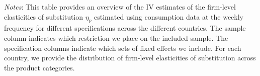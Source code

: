 \begin{landscape}
    \begin{table}[H]
        \centering
        \caption{Weekly Firm-level Elasticities: Dispersion instrument - Country comparison}
        \label{tab: app_elas_eta_cats_weekly_q_comp}
        \begin{spacing}{1}
        \end{spacing}
        \parbox{1.2\textwidth}{
        \vspace{10pt}
        \begin{spacing}{1} 
            {\footnotesize 
            \textit{Notes}: This table provides an overview of the IV estimates of the firm-level elasticities of substitution $\eta_p$ estimated using consumption data at the weekly frequency for different specifications across the different countries. The sample column indicates which restriction we place on the included sample. The specification columns indicate which sets of fixed effects we include. For each country, we provide the distribution of firm-level elasticities of substitution across the product categories.}
            \end{spacing}}
    \end{table}
\end{landscape}

